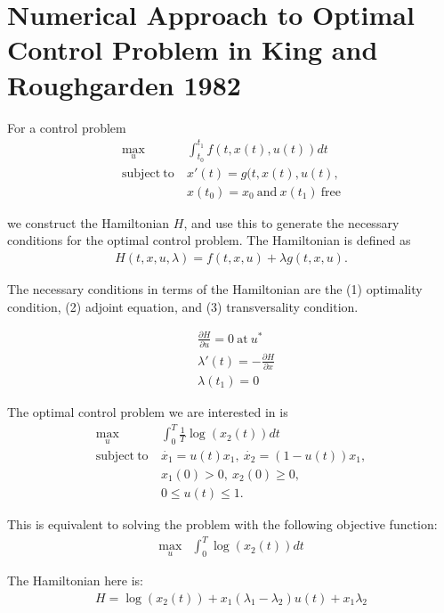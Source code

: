 \documentclass[12pt, oneside]{article}   	%
\begin{document}
 

\section*{Numerical Approach to Optimal Control Problem in King and Roughgarden 1982}

For a control problem 
\begin{align}
\max_{u} &  \int_{t_0}^{t_1} f(t,x(t),u(t)) dt \nonumber \\
\mathrm{subject\ to\ } & x'(t) = g(t,x(t),u(t), \nonumber \\ 
& x(t_0) = x_0\ \mathrm{and}\ x(t_1)\ \mathrm{free}
\end{align}

we construct the Hamiltonian $H$, and use this to generate the necessary conditions for the optimal control problem. The Hamiltonian is defined as
\begin{align}
H(t,x,u,\lambda) = f(t,x,u) + \lambda g(t,x,u).
\end{align}

The necessary conditions in terms of the Hamiltonian are the (1) optimality condition, (2) adjoint equation, and (3) transversality condition.

\begin{align}
&\frac{\partial H}{\partial u} = 0\ \mathrm{at}\ u^* \\
&\lambda'(t) = -\frac{\partial H}{\partial x} \\
&\lambda(t_1) = 0
\end{align}

The optimal control problem we are interested in is
\begin{align}
\max_{u} &  \int_0^T \frac{1}{T} \log( x_2(t) ) dt \nonumber \\
\mathrm{subject\ to\ } & \dot{x_1} = u(t) x_1,\ \dot{x_2} = (1-u(t)) x_1, \nonumber \\ 
& x_1(0) > 0,\ x_2(0) \geq 0,\\
& 0 \leq u(t) \leq 1.
\end{align}

This is equivalent to solving the problem with the following objective function:
\begin{align}
\max_{u} &  \int_0^T  \log( x_2(t) ) dt 
\end{align}

The Hamiltonian here is:
\begin{align}
H = \log( x_2(t) ) + x_1( \lambda_1 - \lambda_2 ) u(t) + x_1 \lambda_2
\end{align}
\end{document}
